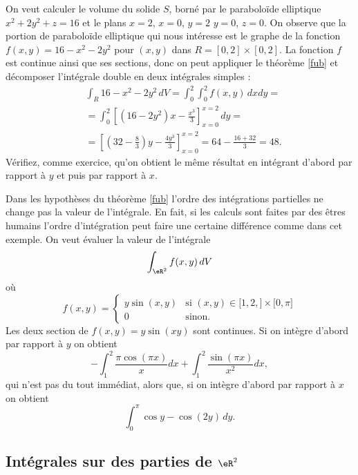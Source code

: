 \begin{example} 
On veut calculer le volume du solide $S$, borné par le paraboloïde elliptique $x^2+2y^2+z=16$ et le plans $x=2$, $x=0$, $y=2$ $y=0$, $z=0$. On observe que la portion de  paraboloïde elliptique qui nous intéresse est le graphe de la fonction $f(x,y)=16-x^2-2y^2$ pour $(x,y)$ dans $R=[0,2]\times[0,2]$. La fonction $f$ est continue ainsi que ses sections, donc on peut appliquer le théorème \ref{fub} et décomposer l'intégrale double en deux intégrales simples :
\begin{equation}
  \begin{aligned}
   & \int_R 16-x^2-2y^2 \,dV= \int_{0}^2\int_{0}^2f(x,y)\,dx dy= \\
&=\int_0^2 \left[(16-2y^2)x-\frac{x^3}{3}\right]_{x=0}^{x=2}\, dy =\\
& = \left[ \left(32-\frac{8}{3}\right) y -\frac{4y^3}{3}\right]_{x=0}^{x=2}= 64- \frac{16+32}{3}=48.
  \end{aligned}
\end{equation}
Vérifiez, comme exercice, qu'on obtient le même résultat en intégrant d'abord par rapport à $y$ et puis par rapport à $x$.  
\end{example}

\begin{example}
  Dans les hypothèses du théorème \ref{fub}  l'ordre des intégrations partielles ne change pas la valeur de l'intégrale. En fait, si les calculs sont faites par des êtres humains l'ordre d'intégration peut faire une certaine différence comme dans cet exemple. On veut évaluer la valeur de l'intégrale 
\[
\int_{\eR^2}f(x,y)\, dV
\]
où 
\begin{equation}
	f(x,y)=\begin{cases}
		y\sin(x,y)	&	\text{si }(x,y)\in\mathopen[ 1,2 ,  \mathclose]\times\mathopen[ 0 , \pi \mathclose]\\
		0	&	 \text{sinon.}
	\end{cases}
\end{equation}
Les deux section de $f(x,y)=y\sin(xy)$ sont continues. Si on intègre d'abord par rapport à $y$ on obtient 
\[
-\int_1^2\frac{ \pi\cos(\pi x) }{ x }dx+\int_1^2\frac{ \sin(\pi x) }{ x^2 }dx,
\] 
qui n'est pas du tout immédiat, alors que, si on intègre d'abord par rapport à $x$ on obtient 
\[
\int_0^\pi \cos y - \cos(2y)\,dy.
\] 
\end{example}

\subsection{Intégrales sur des parties de $\eR^2$ }

